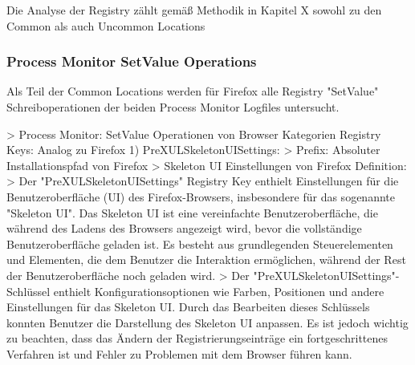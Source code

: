 			Die Analyse der Registry zählt gemäß Methodik in Kapitel X sowohl zu den Common als auch Uncommon Locations 

\subsubsection*{Process Monitor SetValue Operations}

			Als Teil der Common Locations werden für Firefox alle Registry "SetValue" Schreiboperationen der beiden Process Monitor Logfiles untersucht.

> Process Monitor: SetValue Operationen von Browser 
	Kategorien Registry Keys: Analog zu Firefox
	1) PreXULSkeletonUISettings:
		> Prefix: Absoluter Installationspfad von Firefox
		> Skeleton UI Einstellungen von Firefox %
			Definition:
				> Der "PreXULSkeletonUISettings" Registry Key enthielt Einstellungen für die Benutzeroberfläche (UI) des Firefox-Browsers, insbesondere für das sogenannte "Skeleton UI". Das Skeleton UI ist eine vereinfachte Benutzeroberfläche, die während des Ladens des Browsers angezeigt wird, bevor die vollständige Benutzeroberfläche geladen ist. Es besteht aus grundlegenden Steuerelementen und Elementen, die dem Benutzer die Interaktion ermöglichen, während der Rest der Benutzeroberfläche noch geladen wird.
				> Der "PreXULSkeletonUISettings"-Schlüssel enthielt Konfigurationsoptionen wie Farben, Positionen und andere Einstellungen für das Skeleton UI. Durch das Bearbeiten dieses Schlüssels konnten Benutzer die Darstellung des Skeleton UI anpassen. Es ist jedoch wichtig zu beachten, dass das Ändern der Registrierungseinträge ein fortgeschrittenes Verfahren ist und Fehler zu Problemen mit dem Browser führen kann.
			
